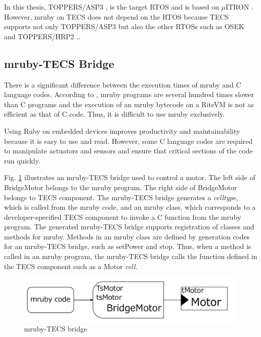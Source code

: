 \documentclass[a4j,12pt,oneside,openany,english]{jsbook}
\begin{document}
In this thesis, TOPPERS/ASP3 \cite{par:ASP3},\cite{url:ASP3} is the target RTOS and is based on $\mu$ITRON \cite{par:microITRON} .
However, mruby on TECS does not depend on the RTOS because TECS supports not only TOPPERS/ASP3 but also the other RTOSs such as OSEK \cite{par:OSEK} and TOPPERS/HRP2 \cite{url:HRP2},\cite{par:hr-tecs}.


\subsection{mruby-TECS Bridge}
There is a significant difference between the execution times of mruby and C language codes.
According to  \cite{par:mrubyonTECS}, mruby programs are several hundred times slower than C programs and the execution of an mruby bytecode on a RiteVM is not as efficient as that of C code.
Thus, it is difficult to use mruby exclusively.

Using Ruby on embedded devices improves productivity and maintainability because it is easy to use and read.
However, some C language codes are required to manipulate actuators and sensors and ensure that critical sections of the code run quickly.

Fig. \ref{fig:mrubyTECSbridge} illustrates an mruby-TECS bridge used to control a motor.
The left side of BridgeMotor belongs to the mruby program.
The right side of BridgeMotor belongs to TECS component.
The mruby-TECS bridge generates a {\it celltype}, which is called from the mruby code, and an mruby class, which corresponds to a developer-specified TECS component to invoke a C function from the mruby program.
The generated mruby-TECS bridge supports registration of classes and methods for mruby.
Methods in an mruby class are defined by generation codes for an mruby-TECS bridge, such as setPower and stop.
Thus, when a method is called in an mruby program, the mruby-TECS bridge calls the function defined in the TECS component such as a Motor {\it cell}.

\begin{figure}[t]
    \centering
    \includegraphics[width=12cm,clip]{figure/mrubyTECSbridge.pdf}
\caption{mruby-TECS bridge}
\label{fig:mrubyTECSbridge}
\end{figure}
\end{document}
